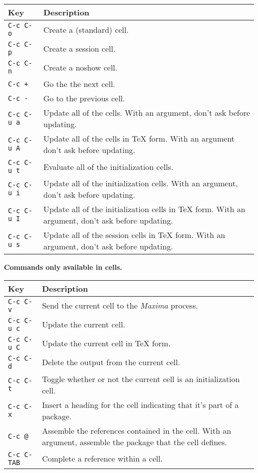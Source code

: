 \documentclass{article}
\newcommand{\mx}{\textsl{\sffamily Maxima}}
\begin{document}
\noindent
\begin{tabular}{p{\firstcol}p{\secondcol}}
\hline
\textbf{Key} & \textbf{Description}\\
\hline
\texttt{C-c C-o} & Create a (standard) cell.\\
\texttt{C-c C-p} & Create a session cell.\\
\texttt{C-c C-n} & Create a noshow cell.\\
\texttt{C-c +} & Go the the next cell.\\
\texttt{C-c -} & Go to the previous cell.\\
\texttt{C-c C-u a} & 
Update all of the cells.  With an argument, don't ask before updating.\\
\texttt{C-c C-u A}
& Update all of the cells in \TeX{} form. With an argument don't ask
before updating.\\
\texttt{C-c C-u t}
& Evaluate all of the initialization cells.\\
\texttt{C-c C-u i}
& Update all of the initialization cells.  With an argument, don't
ask before updating.\\
\texttt{C-c C-u I}
& Update all of the initialization cells in \TeX{} form.  With an
argument, don't ask before updating.\\
\texttt{C-c C-u s}
& Update all of the session cells in \TeX{} form.  With an
argument, don't ask before updating.
\end{tabular}

\smallskip

\noindent
\textbf{Commands only available in cells.}

\smallskip

\noindent
\begin{tabular}{p{\firstcol}p{\secondcol}}
\hline
\textbf{Key} & \textbf{Description}\\
\hline
\texttt{C-c C-v}
& Send the current cell to the \mx{} process.\\
\texttt{C-c C-u c}
& Update the current cell.\\
\texttt{C-c C-u C}
& Update the current cell in \TeX{} form.\\
\texttt{C-c C-d}
& Delete the output from the current cell.\\
\texttt{C-c C-t}
& Toggle whether or not the current cell is an initialization cell.\\
\texttt{C-c C-x}
& Insert a heading for the cell indicating that it's part of a
package. \\
\texttt{C-c @}
& Assemble the references contained in the cell.  With an argument,
assemble the package that the cell defines.\\
\texttt{C-c C-\texttt{TAB}}
& Complete a reference within a cell.
\end{tabular}
\end{document}
